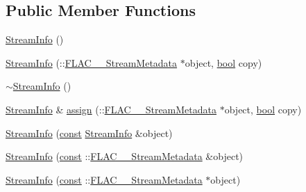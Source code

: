 \subsection*{Public Member Functions}
\begin{DoxyCompactItemize}
\item 
\hyperlink{class_f_l_a_c_1_1_metadata_1_1_stream_info_a0aa78a28084286df0bc42932b4adcfb6}{Stream\+Info} ()
\item 
\hyperlink{class_f_l_a_c_1_1_metadata_1_1_stream_info_aaf4d96124e2b323398f7edf1aaf28003}{Stream\+Info} (\+::\hyperlink{struct_f_l_a_c_____stream_metadata}{F\+L\+A\+C\+\_\+\+\_\+\+Stream\+Metadata} $\ast$object, \hyperlink{mac_2config_2i386_2lib-src_2libsoxr_2soxr-config_8h_abb452686968e48b67397da5f97445f5b}{bool} copy)
\item 
\hyperlink{class_f_l_a_c_1_1_metadata_1_1_stream_info_a9bbee5d65b4ce23f8338fbaca9b66879}{$\sim$\+Stream\+Info} ()
\item 
\hyperlink{class_f_l_a_c_1_1_metadata_1_1_stream_info}{Stream\+Info} \& \hyperlink{class_f_l_a_c_1_1_metadata_1_1_stream_info_ad1193a408a5735845dea17a131b7282c}{assign} (\+::\hyperlink{struct_f_l_a_c_____stream_metadata}{F\+L\+A\+C\+\_\+\+\_\+\+Stream\+Metadata} $\ast$object, \hyperlink{mac_2config_2i386_2lib-src_2libsoxr_2soxr-config_8h_abb452686968e48b67397da5f97445f5b}{bool} copy)
\end{DoxyCompactItemize}
{\bf }\par
\begin{DoxyCompactItemize}
\item 
\hyperlink{class_f_l_a_c_1_1_metadata_1_1_stream_info_ab86611073f13dd3e7aea386bb6f1a7a4}{Stream\+Info} (\hyperlink{getopt1_8c_a2c212835823e3c54a8ab6d95c652660e}{const} \hyperlink{class_f_l_a_c_1_1_metadata_1_1_stream_info}{Stream\+Info} \&object)
\item 
\hyperlink{class_f_l_a_c_1_1_metadata_1_1_stream_info_a3f23948afbcb54758d0ed20edd86515c}{Stream\+Info} (\hyperlink{getopt1_8c_a2c212835823e3c54a8ab6d95c652660e}{const} \+::\hyperlink{struct_f_l_a_c_____stream_metadata}{F\+L\+A\+C\+\_\+\+\_\+\+Stream\+Metadata} \&object)
\item 
\hyperlink{class_f_l_a_c_1_1_metadata_1_1_stream_info_a24e2028916ac96e0ed0d1e53e003b150}{Stream\+Info} (\hyperlink{getopt1_8c_a2c212835823e3c54a8ab6d95c652660e}{const} \+::\hyperlink{struct_f_l_a_c_____stream_metadata}{F\+L\+A\+C\+\_\+\+\_\+\+Stream\+Metadata} $\ast$object)
\end{DoxyCompactItemize}

